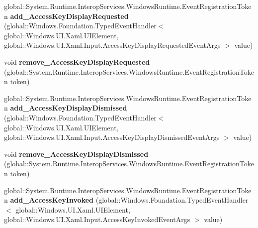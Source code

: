 \begin{DoxyCompactItemize}
global\+::\+System.\+Runtime.\+Interop\+Services.\+Windows\+Runtime.\+Event\+Registration\+Token {\bfseries add\+\_\+\+Access\+Key\+Display\+Requested} (global\+::\+Windows.\+Foundation.\+Typed\+Event\+Handler$<$ global\+::\+Windows.\+U\+I.\+Xaml.\+U\+I\+Element, global\+::\+Windows.\+U\+I.\+Xaml.\+Input.\+Access\+Key\+Display\+Requested\+Event\+Args $>$ value)
\item 
\mbox{\label{interface_windows_1_1_u_i_1_1_xaml_1_1_i_u_i_element4_aea049ec23f1d2f3b558644a30bbda62d}} 
void {\bfseries remove\+\_\+\+Access\+Key\+Display\+Requested} (global\+::\+System.\+Runtime.\+Interop\+Services.\+Windows\+Runtime.\+Event\+Registration\+Token token)
\item 
\mbox{\label{interface_windows_1_1_u_i_1_1_xaml_1_1_i_u_i_element4_a9d51d9f59f40a6fabc504798338e3514}} 
global\+::\+System.\+Runtime.\+Interop\+Services.\+Windows\+Runtime.\+Event\+Registration\+Token {\bfseries add\+\_\+\+Access\+Key\+Display\+Dismissed} (global\+::\+Windows.\+Foundation.\+Typed\+Event\+Handler$<$ global\+::\+Windows.\+U\+I.\+Xaml.\+U\+I\+Element, global\+::\+Windows.\+U\+I.\+Xaml.\+Input.\+Access\+Key\+Display\+Dismissed\+Event\+Args $>$ value)
\item 
\mbox{\label{interface_windows_1_1_u_i_1_1_xaml_1_1_i_u_i_element4_a3571804f8a98025c430544d76cfc6f74}} 
void {\bfseries remove\+\_\+\+Access\+Key\+Display\+Dismissed} (global\+::\+System.\+Runtime.\+Interop\+Services.\+Windows\+Runtime.\+Event\+Registration\+Token token)
\item 
\mbox{\label{interface_windows_1_1_u_i_1_1_xaml_1_1_i_u_i_element4_abbf41cd69a2641b693ab19a02690a325}} 
global\+::\+System.\+Runtime.\+Interop\+Services.\+Windows\+Runtime.\+Event\+Registration\+Token {\bfseries add\+\_\+\+Access\+Key\+Invoked} (global\+::\+Windows.\+Foundation.\+Typed\+Event\+Handler$<$ global\+::\+Windows.\+U\+I.\+Xaml.\+U\+I\+Element, global\+::\+Windows.\+U\+I.\+Xaml.\+Input.\+Access\+Key\+Invoked\+Event\+Args $>$ value)
\item 
\mbox{\label{interface_windows_1_1_u_i_1_1_xaml_1_1_i_u_i_element4_ae34bf72d8d0d7a9d33ede980ae1b29db}} 

\end{DoxyCompactItemize}
